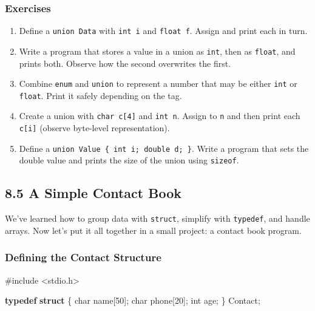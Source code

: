 \documentclass[
  letterpaper,
  DIV=11,
  numbers=noendperiod]{scrreprt}
\newenvironment{Shaded}{\begin{snugshade}}{\end{snugshade}}
\newcommand{\DataTypeTok}[1]{\textcolor[rgb]{0.68,0.00,0.00}{#1}}
\newcommand{\DecValTok}[1]{\textcolor[rgb]{0.68,0.00,0.00}{#1}}
\newcommand{\ImportTok}[1]{\textcolor[rgb]{0.00,0.46,0.62}{#1}}
\newcommand{\KeywordTok}[1]{\textcolor[rgb]{0.00,0.23,0.31}{\textbf{#1}}}
\newcommand{\NormalTok}[1]{\textcolor[rgb]{0.00,0.23,0.31}{#1}}
\newcommand{\OperatorTok}[1]{\textcolor[rgb]{0.37,0.37,0.37}{#1}}
\newcommand{\PreprocessorTok}[1]{\textcolor[rgb]{0.68,0.00,0.00}{#1}}
\providecommand{\tightlist}{%
  \setlength{\itemsep}{0pt}\setlength{\parskip}{0pt}}
\begin{document}
\subsubsection{Exercises}\label{exercises-38}

\begin{enumerate}
\def\labelenumi{\arabic{enumi}.}
\tightlist
\item
  Define a \texttt{union\ Data} with \texttt{int\ i} and
  \texttt{float\ f}. Assign and print each in turn.
\item
  Write a program that stores a value in a union as \texttt{int}, then
  as \texttt{float}, and prints both. Observe how the second overwrites
  the first.
\item
  Combine \texttt{enum} and \texttt{union} to represent a number that
  may be either \texttt{int} or \texttt{float}. Print it safely
  depending on the tag.
\item
  Create a union with \texttt{char\ c{[}4{]}} and \texttt{int\ n}.
  Assign to \texttt{n} and then print each \texttt{c{[}i{]}} (observe
  byte-level representation).
\item
  Define a \texttt{union\ Value\ \{\ int\ i;\ double\ d;\ \}}. Write a
  program that sets the double value and prints the size of the union
  using \texttt{sizeof}.
\end{enumerate}

\subsection{8.5 A Simple Contact Book}\label{a-simple-contact-book}

We've learned how to group data with \texttt{struct}, simplify with
\texttt{typedef}, and handle arrays. Now let's put it all together in a
small project: a contact book program.

\subsubsection{Defining the Contact
Structure}\label{defining-the-contact-structure}

\begin{Shaded}
\begin{Highlighting}[]
\PreprocessorTok{\#include }\ImportTok{\textless{}stdio.h\textgreater{}}

\KeywordTok{typedef} \KeywordTok{struct} \OperatorTok{\{}
    \DataTypeTok{char}\NormalTok{ name}\OperatorTok{[}\DecValTok{50}\OperatorTok{];}
    \DataTypeTok{char}\NormalTok{ phone}\OperatorTok{[}\DecValTok{20}\OperatorTok{];}
    \DataTypeTok{int}\NormalTok{ age}\OperatorTok{;}
\OperatorTok{\}}\NormalTok{ Contact}\OperatorTok{;}
\end{Highlighting}
\end{Shaded}
\end{document}
